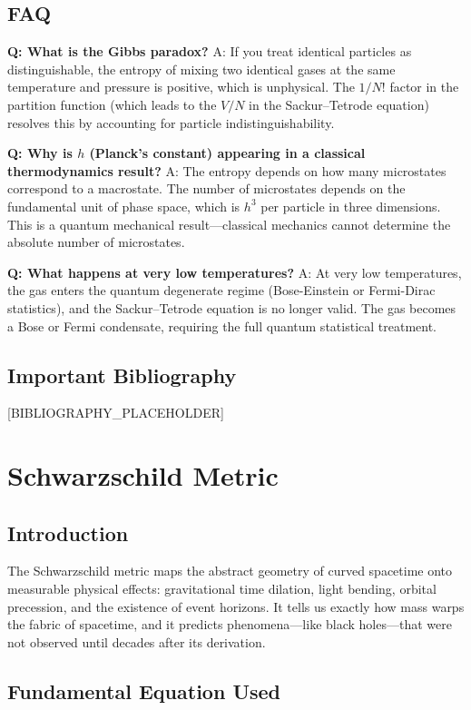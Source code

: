 \documentclass[11pt,openright]{book}
\begin{document}
\section*{FAQ}

\textbf{Q: What is the Gibbs paradox?}
A: If you treat identical particles as distinguishable, the entropy of mixing two identical gases at the same temperature and pressure is positive, which is unphysical. The $1/N!$ factor in the partition function (which leads to the $V/N$ in the Sackur--Tetrode equation) resolves this by accounting for particle indistinguishability.

\textbf{Q: Why is $h$ (Planck's constant) appearing in a classical thermodynamics result?}
A: The entropy depends on how many microstates correspond to a macrostate. The number of microstates depends on the fundamental unit of phase space, which is $h^3$ per particle in three dimensions. This is a quantum mechanical result---classical mechanics cannot determine the absolute number of microstates.

\textbf{Q: What happens at very low temperatures?}
A: At very low temperatures, the gas enters the quantum degenerate regime (Bose-Einstein or Fermi-Dirac statistics), and the Sackur--Tetrode equation is no longer valid. The gas becomes a Bose or Fermi condensate, requiring the full quantum statistical treatment.
\section*{Important Bibliography}

[BIBLIOGRAPHY_PLACEHOLDER]


\chapter{Schwarzschild Metric}

\section*{Introduction}

The Schwarzschild metric maps the abstract geometry of curved spacetime onto measurable physical effects: gravitational time dilation, light bending, orbital precession, and the existence of event horizons. It tells us exactly how mass warps the fabric of spacetime, and it predicts phenomena---like black holes---that were not observed until decades after its derivation.
\section*{Fundamental Equation Used}
\end{document}
